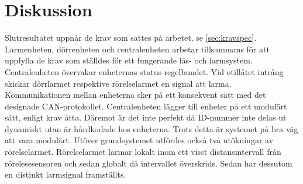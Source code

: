 \section{Diskussion}
\label{sec:diskussion}
Slutresultatet uppnår de krav som sattes på arbetet, se \ref{sec:kravspec}. Larmenheten, dörrenheten och centralenheten arbetar tillsammans för att uppfylla de krav som ställdes för ett fungerande lås- och larmsystem. Centralenheten övervakar enheternas status regelbundet. Vid otillåtet intrång skickar dörrlarmet respektive rörelselarmet en signal att larma. Kommunikationen mellan enheterna sker på ett konsekvent sätt med det designade CAN-protokollet. Centralenheten lägger till enheter på ett modulärt sätt, enligt krav åtta. Däremot är det inte perfekt då ID-nummer inte delas ut dynamiskt utan är hårdkodade hos enheterna. Trots detta är systemet på bra väg att vara modulärt.
\newline \newline
Utöver grundsystemet utfördes också två utökningar av rörelselarmet. Rörelselarmet larmar lokalt inom ett visst distansintervall från rörelesesensoren och sedan globalt då intervallet överskrids. Sedan har dessutom en distinkt larmsignal framställts.
